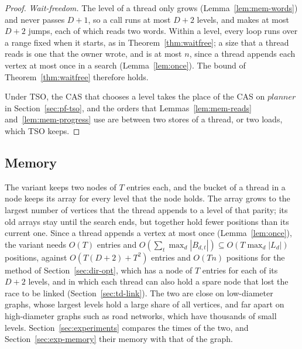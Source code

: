 \begin{proof}
\emph{Wait-freedom.} The level of a thread only grows (Lemma~\ref{lem:mem-words}) and never passes $D+1$, so a call runs at most $D+2$ levels, and makes at most $D+2$ jumps, each of which reads two words. Within a level, every loop runs over a range fixed when it starts, as in Theorem~\ref{thm:waitfree}; a size that a thread reads is one that the owner wrote, and is at most $n$, since a thread appends each vertex at most once in a search (Lemma~\ref{lem:once}). The bound of Theorem~\ref{thm:waitfree} therefore holds.

Under TSO, the CAS that chooses a level takes the place of the CAS on $\mathit{planner}$ in Section~\ref{sec:pf-tso}, and the orders that Lemmas~\ref{lem:mem-reads} and~\ref{lem:mem-progress} use are between two stores of a thread, or two loads, which TSO keeps.
\end{proof}

\subsection{Memory}
\label{sec:mem-memory}

The variant keeps two nodes of $T$ entries each, and the bucket of a thread in a node keeps its array for every level that the node holds. The array grows to the largest number of vertices that the thread appends to a level of that parity; its old arrays stay until the search ends, but together hold fewer positions than its current one. Since a thread appends a vertex at most once (Lemma~\ref{lem:once}), the variant needs $O(T)$ entries and $O(\sum_t \max_d |B_{d,t}|) \subseteq O(T \max_d |L_d|)$ positions, against $O(T(D+2) + T^2)$ entries and $O(Tn)$ positions for the method of Section~\ref{sec:dir-opt}, which has a node of $T$ entries for each of its $D+2$ levels, and in which each thread can also hold a spare node that lost the race to be linked (Section~\ref{sec:td-link}). The two are close on low-diameter graphs, whose largest levels hold a large share of all vertices, and far apart on high-diameter graphs such as road networks, which have thousands of small levels. Section~\ref{sec:experiments} compares the times of the two, and Section~\ref{sec:exp-memory} their memory with that of the graph.
